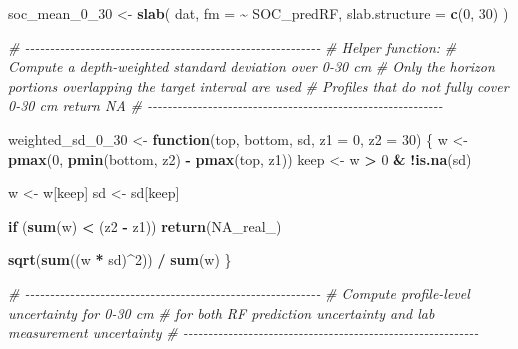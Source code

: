 \documentclass[
  10pt,
  b5paper,
  oneside]{book}
\newenvironment{Shaded}{\begin{snugshade}}{\end{snugshade}}
\newcommand{\AttributeTok}[1]{\textcolor[rgb]{0.13,0.29,0.53}{#1}}
\newcommand{\CommentTok}[1]{\textcolor[rgb]{0.56,0.35,0.01}{\textit{#1}}}
\newcommand{\ConstantTok}[1]{\textcolor[rgb]{0.56,0.35,0.01}{#1}}
\newcommand{\ControlFlowTok}[1]{\textcolor[rgb]{0.13,0.29,0.53}{\textbf{#1}}}
\newcommand{\DecValTok}[1]{\textcolor[rgb]{0.00,0.00,0.81}{#1}}
\newcommand{\FunctionTok}[1]{\textcolor[rgb]{0.13,0.29,0.53}{\textbf{#1}}}
\newcommand{\NormalTok}[1]{#1}
\newcommand{\OtherTok}[1]{\textcolor[rgb]{0.56,0.35,0.01}{#1}}
\newcommand{\SpecialCharTok}[1]{\textcolor[rgb]{0.81,0.36,0.00}{\textbf{#1}}}
\begin{document}
\begin{Shaded}
\begin{Highlighting}[]
\NormalTok{soc\_mean\_0\_30 }\OtherTok{\textless{}{-}} \FunctionTok{slab}\NormalTok{(}
\NormalTok{  dat,}
  \AttributeTok{fm =} \SpecialCharTok{\textasciitilde{}}\NormalTok{ SOC\_predRF,}
  \AttributeTok{slab.structure =} \FunctionTok{c}\NormalTok{(}\DecValTok{0}\NormalTok{, }\DecValTok{30}\NormalTok{)}
\NormalTok{)}

\CommentTok{\# {-}{-}{-}{-}{-}{-}{-}{-}{-}{-}{-}{-}{-}{-}{-}{-}{-}{-}{-}{-}{-}{-}{-}{-}{-}{-}{-}{-}{-}{-}{-}{-}{-}{-}{-}{-}{-}{-}{-}{-}{-}{-}{-}{-}{-}{-}{-}{-}{-}{-}{-}{-}{-}{-}{-}{-}{-}{-}{-}}
\CommentTok{\# Helper function:}
\CommentTok{\# Compute a depth{-}weighted standard deviation over 0{-}30 cm}
\CommentTok{\# Only the horizon portions overlapping the target interval are used}
\CommentTok{\# Profiles that do not fully cover 0{-}30 cm return NA}
\CommentTok{\# {-}{-}{-}{-}{-}{-}{-}{-}{-}{-}{-}{-}{-}{-}{-}{-}{-}{-}{-}{-}{-}{-}{-}{-}{-}{-}{-}{-}{-}{-}{-}{-}{-}{-}{-}{-}{-}{-}{-}{-}{-}{-}{-}{-}{-}{-}{-}{-}{-}{-}{-}{-}{-}{-}{-}{-}{-}{-}{-}}

\NormalTok{weighted\_sd\_0\_30 }\OtherTok{\textless{}{-}} \ControlFlowTok{function}\NormalTok{(top, bottom, sd, }\AttributeTok{z1 =} \DecValTok{0}\NormalTok{, }\AttributeTok{z2 =} \DecValTok{30}\NormalTok{) \{}
\NormalTok{  w }\OtherTok{\textless{}{-}} \FunctionTok{pmax}\NormalTok{(}\DecValTok{0}\NormalTok{, }\FunctionTok{pmin}\NormalTok{(bottom, z2) }\SpecialCharTok{{-}} \FunctionTok{pmax}\NormalTok{(top, z1))}
\NormalTok{  keep }\OtherTok{\textless{}{-}}\NormalTok{ w }\SpecialCharTok{\textgreater{}} \DecValTok{0} \SpecialCharTok{\&} \SpecialCharTok{!}\FunctionTok{is.na}\NormalTok{(sd)}
  
\NormalTok{  w  }\OtherTok{\textless{}{-}}\NormalTok{ w[keep]}
\NormalTok{  sd }\OtherTok{\textless{}{-}}\NormalTok{ sd[keep]}
  
  \ControlFlowTok{if}\NormalTok{ (}\FunctionTok{sum}\NormalTok{(w) }\SpecialCharTok{\textless{}}\NormalTok{ (z2 }\SpecialCharTok{{-}}\NormalTok{ z1)) }\FunctionTok{return}\NormalTok{(}\ConstantTok{NA\_real\_}\NormalTok{)}
  
  \FunctionTok{sqrt}\NormalTok{(}\FunctionTok{sum}\NormalTok{((w }\SpecialCharTok{*}\NormalTok{ sd)}\SpecialCharTok{\^{}}\DecValTok{2}\NormalTok{)) }\SpecialCharTok{/} \FunctionTok{sum}\NormalTok{(w)}
\NormalTok{\}}

\CommentTok{\# {-}{-}{-}{-}{-}{-}{-}{-}{-}{-}{-}{-}{-}{-}{-}{-}{-}{-}{-}{-}{-}{-}{-}{-}{-}{-}{-}{-}{-}{-}{-}{-}{-}{-}{-}{-}{-}{-}{-}{-}{-}{-}{-}{-}{-}{-}{-}{-}{-}{-}{-}{-}{-}{-}{-}{-}{-}{-}{-}}
\CommentTok{\# Compute profile{-}level uncertainty for 0{-}30 cm}
\CommentTok{\# for both RF prediction uncertainty and lab measurement uncertainty}
\CommentTok{\# {-}{-}{-}{-}{-}{-}{-}{-}{-}{-}{-}{-}{-}{-}{-}{-}{-}{-}{-}{-}{-}{-}{-}{-}{-}{-}{-}{-}{-}{-}{-}{-}{-}{-}{-}{-}{-}{-}{-}{-}{-}{-}{-}{-}{-}{-}{-}{-}{-}{-}{-}{-}{-}{-}{-}{-}{-}{-}{-}}


\end{Highlighting}
\end{Shaded}
\end{document}
